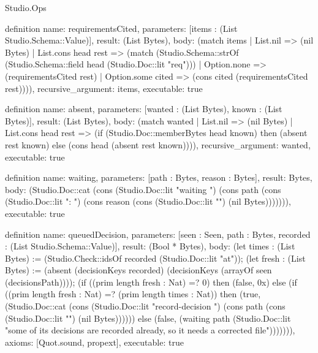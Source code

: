 \begin{lexlean}{Studio.Ops}
\begin{semanticmodule}
{definition{
  name: requirementsCited,
  parameters: [items : (List Studio.Schema::Value)],
  result: (List Bytes),
  body: (match items
    | List.nil => (nil Bytes)
    | List.cons head rest => (match (Studio.Schema::strOf (Studio.Schema::field head (Studio.Doc::lit "req")))
      | Option.none => (requirementsCited rest)
      | Option.some cited => (cons cited (requirementsCited rest)))),
  recursive_argument: items,
  executable: true
}

definition{
  name: absent,
  parameters: [wanted : (List Bytes), known : (List Bytes)],
  result: (List Bytes),
  body: (match wanted
    | List.nil => (nil Bytes)
    | List.cons head rest => (if (Studio.Doc::memberBytes head known) then (absent rest known) else (cons head (absent rest known)))),
  recursive_argument: wanted,
  executable: true
}

definition{
  name: waiting,
  parameters: [path : Bytes, reason : Bytes],
  result: Bytes,
  body: (Studio.Doc::cat (cons (Studio.Doc::lit "waiting ") (cons path (cons (Studio.Doc::lit ": ") (cons reason (cons (Studio.Doc::lit "\n") (nil Bytes))))))),
  executable: true
}

definition{
  name: queuedDecision,
  parameters: [seen : Seen, path : Bytes, recorded : (List Studio.Schema::Value)],
  result: (Bool * Bytes),
  body: (let times : (List Bytes) := (Studio.Check::idsOf recorded (Studio.Doc::lit "at")); (let fresh : (List Bytes) := (absent (decisionKeys recorded) (decisionKeys (arrayOf seen (decisionsPath)))); (if ((prim length fresh : Nat) =? 0) then (false, 0x) else (if ((prim length fresh : Nat) =? (prim length times : Nat)) then (true, (Studio.Doc::cat (cons (Studio.Doc::lit "record-decision ") (cons path (cons (Studio.Doc::lit "\n") (nil Bytes)))))) else (false, (waiting path (Studio.Doc::lit "some of its decisions are recorded already, so it needs a corrected file"))))))),
  axioms: [Quot.sound, propext],
  executable: true
}

}
\end{semanticmodule}
\end{lexlean}
